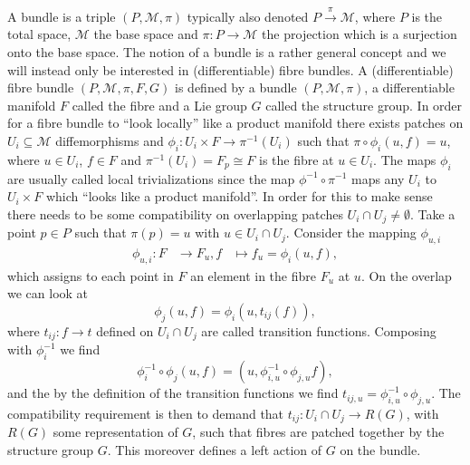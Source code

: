 A bundle is a triple $(P,\mathcal{M},\pi)$ typically also denoted $P\overset{\pi}{\longrightarrow}\mathcal{M}$, where $P$ is the total space, $\mathcal{M}$ the base space and $\pi: P\to \mathcal{M}$ the projection which is a surjection onto the base space. The notion of a bundle is a rather general concept and we will instead only be interested in (differentiable) fibre bundles. A (differentiable) fibre bundle $(P,\mathcal{M},\pi,F,G)$ is defined by a bundle $(P,\mathcal{M},\pi)$, a differentiable manifold $F$ called the fibre and a Lie group $G$ called the structure group. In order for a fibre bundle to ``look locally'' like a product manifold there exists patches on $U_i\subseteq \mathcal{M}$ diffemorphisms and $\phi_i: U_i\times F\to \pi^{-1}(U_i)$ such that $\pi\circ \phi_i(u,f)=u$, where $u\in U_i$, $f\in F$ and $\pi^{-1}(U_i)=F_p\cong F$ is the fibre at $u\in U_i$. The maps $\phi_i$ are usually called local trivializations since the map $\phi^{-1}\circ \pi^{-1}$ maps any $U_i$ to $U_i\times F$ which ``looks like a product manifold''. In order for this to make sense there needs to be some compatibility on overlapping patches $U_i\cap U_j\neq \emptyset$. Take a point $p\in P$ such that $\pi(p)=u$ with $u\in U_i\cap U_j$. Consider the mapping $\phi_{u,i}$
\begin{equation}
    \begin{aligned}
        \phi_{u,i}: F&\to F_u,
            f&\mapsto f_u = \phi_i(u,f),
    \end{aligned}
\end{equation}
which assigns to each point in $F$ an element in the fibre $F_u$ at $u$. On the overlap we can look at 
\begin{equation}
    \phi_{j}(u,f) = \phi_{i}(u,t_{ij}(f)),
\end{equation}
where $t_{ij}:f\to t$ defined on $U_i\cap U_j$ are called transition functions. Composing with $\phi_i^{-1}$ we find 
\begin{equation}
    \phi_{i}^{-1}\circ\phi_j (u,f) = (u,\phi^{-1}_{i,u}\circ \phi_{j,u}f),
\end{equation}
and the by the definition of the transition functions we find $t_{ij,u}=\phi^{-1}_{i,u}\circ \phi_{j,u}$. The compatibility requirement is then to demand that $t_{ij}: U_i\cap U_j\to R(G)$, with $R(G)$ some representation of $G$, such that fibres are patched together by the structure group $G$. This moreover defines a left action of $G$ on the bundle.

